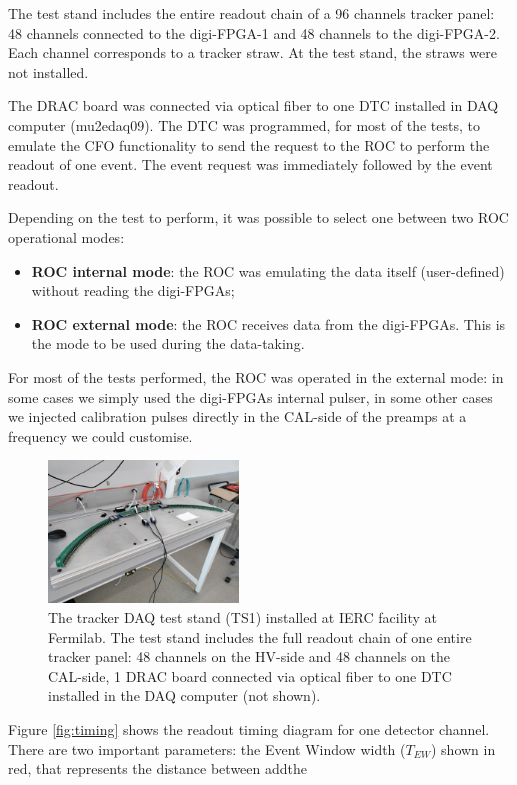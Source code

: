   The test stand includes the entire readout 
  chain of a 96 channels tracker panel:  
  48 channels connected to the digi-FPGA-1 and 
  48 channels to the digi-FPGA-2. 
  Each channel corresponds to a tracker straw. 
  At the test stand, the straws were not installed.

  The DRAC board was connected via optical 
  fiber to one DTC installed in DAQ computer (mu2edaq09).
  The DTC was programmed, for most of the  
  tests, to emulate the CFO 
  functionality to send the request to the 
  ROC to perform the readout of one event.
  The event request was immediately 
  followed by the event readout.


    Depending on the test to perform, it was possible to 
    select one between  two ROC operational modes:
    \begin{itemize}
    \item  \textbf{ROC internal mode}: the ROC was emulating the data 
    itself (user-defined) without reading the digi-FPGAs;
    \item  \textbf{ROC external mode}: the ROC receives data 
    from the digi-FPGAs. This is the mode to be used during 
    the data-taking.
    \end{itemize}
    For most of the tests performed, the ROC was operated 
    in the external mode: in some cases we simply used the 
    digi-FPGAs internal pulser, in some other cases we injected 
    calibration pulses directly in the CAL-side of the preamps at 
    a frequency we could customise.
    \begin{figure}[!h]
        \centering
        \includegraphics[width =0.45\textwidth]{figures/jpg/IMG_20240219_090538.jpg}
        \caption[The tracker DAQ test stand.]{The tracker DAQ test stand (TS1) installed at IERC facility 
        at Fermilab. The test stand includes the full readout chain 
        of one entire tracker panel: 48 channels on the HV-side 
        and 48 channels on the CAL-side, 1 DRAC board connected 
        via optical fiber to one DTC installed in the DAQ computer 
        (not shown).}
        \label{fig:TS1}
        \end{figure}
    Figure \ref{fig:timing} shows the readout timing diagram 
    for one detector channel.
    There are two important parameters: 
    the Event Window width ($T_{EW}$) shown in red, 
    that represents the distance between add{the} 

